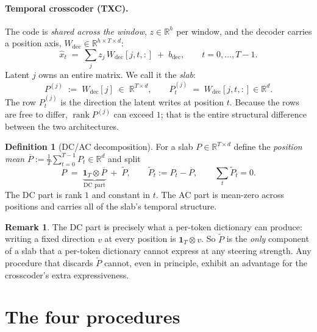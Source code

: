 \documentclass[11pt]{article}
\theoremstyle{definition}
\newtheorem{definition}[proposition]{Definition}
\newtheorem{remark}[proposition]{Remark}
\newcommand{\Rbb}{\mathbb{R}}
\newcommand{\one}{\mathbf{1}}
\newcommand{\Wdec}{W_{\mathrm{dec}}}
\newcommand{\slab}{P}
\newcommand{\dc}{\overline{\slab}}
\newcommand{\ac}{\widetilde{\slab}}
\begin{document}
\paragraph{Temporal crosscoder (TXC).} The code is \emph{shared across the window},
$z \in \Rbb^{h}$ per window, and the decoder carries a position axis,
$\Wdec \in \Rbb^{h\times T\times d}$:
\begin{equation}
  \hat{x}_t \;=\; \sum_j z_j \, \Wdec[j,t,:] \;+\; b_{\mathrm{dec}},
  \qquad t = 0,\dots,T-1 .
  \label{eq:txc-decode}
\end{equation}
Latent $j$ owns an entire matrix. We call it the \emph{slab}:
\begin{equation}
  \slab^{(j)} \;:=\; \Wdec[j] \;\in\; \Rbb^{T\times d},
  \qquad
  \slab^{(j)}_t \;=\; \Wdec[j,t,:] \in \Rbb^{d}.
\end{equation}
The row $\slab^{(j)}_t$ is the direction the latent writes at position $t$. Because the rows are
free to differ, $\operatorname{rank}\slab^{(j)}$ can exceed $1$; that is the entire structural
difference between the two architectures.

\begin{definition}[DC/AC decomposition]
\label{def:dcac}
For a slab $\slab \in \Rbb^{T\times d}$ define the \emph{position mean}
$\dc := \tfrac{1}{T}\sum_{t=0}^{T-1}\slab_t \in \Rbb^d$ and split
\begin{equation}
  \slab \;=\; \underbrace{\one_T \otimes \dc}_{\text{DC part}} \;+\; \ac,
  \qquad
  \ac_t := \slab_t - \dc,
  \qquad
  \sum_{t}\ac_t = 0 .
  \label{eq:dcac}
\end{equation}
The DC part is rank $1$ and constant in $t$. The AC part is mean-zero across positions and
carries all of the slab's temporal structure.
\end{definition}

\begin{remark}
The DC part is precisely what a per-token dictionary can produce: writing a fixed direction
$v$ at every position is $\one_T\otimes v$. So $\ac$ is the \emph{only} component of a slab
that a per-token dictionary cannot express at any steering strength. Any procedure that
discards $\ac$ cannot, even in principle, exhibit an advantage for the crosscoder's extra
expressiveness.
\end{remark}

\section{The four procedures}
\end{document}
